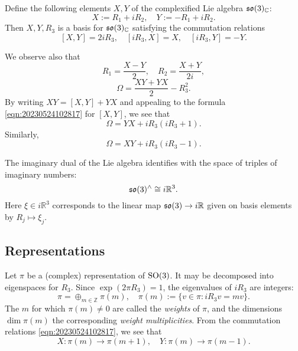 \documentclass[reqno]{amsart} 
\numberwithin{equation}{section}
\begin{document}
Define the following elements $X,Y$ of the complexified Lie algebra $\operatorname{\mathfrak{s}\mathfrak{o}}(3)_{\mathbb{C}}$:
\begin{equation*}
  X := R_1 + i R_2,
  \quad
  Y := -R_1 + i R_2.
\end{equation*}
Then $X,Y,R_3$ is a basis for $\operatorname{\mathfrak{s}\mathfrak{o}}(3)_{\mathbb{C}}$ satisfying the commutation relations
\begin{equation}\label{eqn:20230524102817} [X,Y] = 2 i R_3,
  \quad
  [i R_3, X] = X,
  \quad
  [i R_3, Y] = - Y.
\end{equation}

We observe also that
\begin{equation*}
  R_1 = \frac{X - Y}{2},
  \quad
  R_2 = \frac{X + Y}{2 i},
\end{equation*}
\begin{equation*}
  \Omega =
  \frac{X Y + Y X}{2} - R_3^2.
\end{equation*}
By writing $X Y = [X,Y] + Y X$ and appealing to the formula \eqref{eqn:20230524102817} for $[X,Y]$, we see that
\begin{equation}\label{eqn:20230524102839}
  \Omega = Y X +  i R_3(i R_3 + 1).
\end{equation}
Similarly,
\begin{equation}\label{eqn:20230524104145}
  \Omega = X Y  + i R_3 (i R_3 - 1).
\end{equation}

The imaginary dual of the Lie algebra identifies with the space of triples of imaginary numbers:
\begin{equation}\label{eqn:d1a914f48fd7}
\operatorname{\mathfrak{s}\mathfrak{o}}(3)^\wedge \cong  i \mathbb{R}^3.
\end{equation}
Here $\xi \in i \mathbb{R}^3$ corresponds to the linear map $\operatorname{\mathfrak{s}\mathfrak{o}}(3) \rightarrow i \mathbb{R}$ given on basis elements by $R_j \mapsto \xi_j$.

\subsection{Representations}\label{sec:d1a9162ec67d}
Let $\pi$ be a (complex) representation of $\operatorname{SO}(3)$.  It may be decomposed into eigenspaces for $R_3$.  Since $\exp(2 \pi R_3) = 1$, the eigenvalues of $i R_3$ are integers:
\begin{equation*}
  \pi = \oplus_{m \in \mathbb{Z}} \pi(m),
  \quad
  \pi(m) := \{ v \in \pi : i R_3 v = m v \}.
\end{equation*}
The $m$ for which $\pi(m) \neq 0$ are called the \emph{weights} of $\pi$, and the dimensions $\dim \pi(m)$ the corresponding \emph{weight multiplicities}.
From the commutation relations \eqref{eqn:20230524102817}, we see that
\begin{equation}\label{eqn:20230524104326}
  X : \pi(m) \rightarrow \pi(m+1),
  \quad
  Y : \pi(m) \rightarrow \pi(m-1).
\end{equation}
\end{document}
